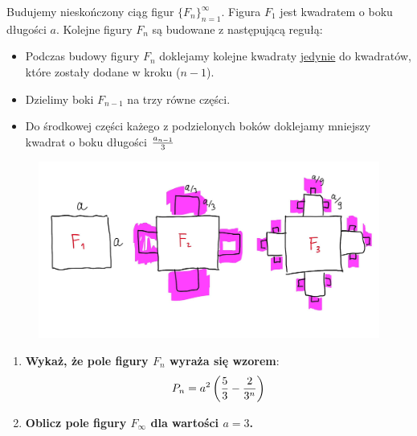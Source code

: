 Budujemy nieskończony ciąg figur $\{F_n\}_{n=1}^\infty$.
Figura $F_1$ jest kwadratem o boku długości $a$.
Kolejne figury $F_n$ są budowane z następującą regułą:
\begin{itemize}
    \item Podczas budowy figury $F_{n}$ doklejamy kolejne kwadraty \underline{jedynie} do kwadratów, które zostały dodane w kroku ($n-1$). 
    \item Dzielimy boki $F_{n-1}$ na trzy równe części.
    \item Do środkowej części każego z podzielonych boków doklejamy mniejszy kwadrat o boku długości $a_{n-1}\over 3$
\end{itemize}

\begin{figure}[htbp]
    \centering
    \includegraphics[width=0.6\columnwidth]{figures/zad10.png}
    \label{fig:enter-label}
\end{figure}


\begin{enumerate}
    \item \textbf{Wykaż, że pole figury $F_n$ wyraża się wzorem}:
$$
P_n = a^2\left({5\over 3} - {2 \over {3^n}}\right)
$$
\item \textbf{Oblicz pole figury $F_\infty$ dla wartości $a=3$.}

\end{enumerate}